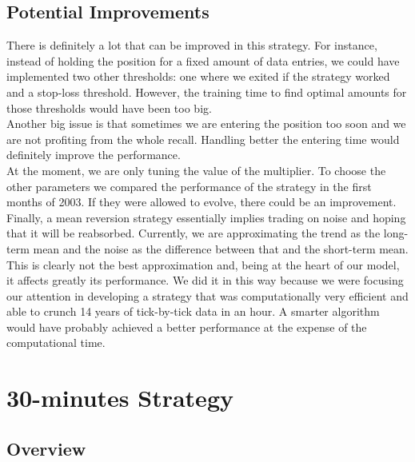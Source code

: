 \documentclass[a4paper]{article}
\begin{document}
\subsection{Potential Improvements}

There is definitely a lot that can be improved in this strategy. For instance, instead of holding the position for a fixed amount of data entries, we could have implemented two other thresholds: one where we exited if the strategy worked and a stop-loss threshold. However, the training time to find optimal amounts for those thresholds would have been too big.\\
Another big issue is that sometimes we are entering the position too soon and we are not profiting from the whole recall. Handling better the entering time would definitely improve the performance.\\
At the moment, we are only tuning the value of the multiplier. To choose the other parameters we compared the performance of the strategy in the first months of 2003. If they were allowed to evolve, there could be an improvement.\\
Finally, a mean reversion strategy essentially implies trading on noise and hoping that it will be reabsorbed. Currently, we are approximating the trend as the long-term mean and the noise as the difference between that and the short-term mean. This is clearly not the best approximation and, being at the heart of our model, it affects greatly its performance. We did it in this way because we were focusing our attention in developing a strategy that was computationally very efficient and able to crunch 14 years of tick-by-tick data in an hour. A smarter algorithm would have probably achieved a better performance at the expense of the computational time.



\section{30-minutes Strategy}

\subsection{Overview}
\end{document}

